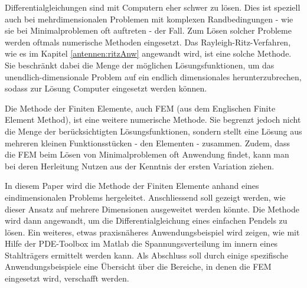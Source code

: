 %
%
%
%



Differentialgleichungen sind mit Computern eher schwer zu lösen. 
Dies ist speziell auch bei mehrdimensionalen Problemen mit komplexen Randbedingungen - wie sie bei Minimalproblemen oft auftreten - der Fall. 
Zum Lösen solcher Probleme werden oftmals numerische Methoden eingesetzt. 
Das Rayleigh-Ritz-Verfahren, wie es im Kapitel \ref{antennen:ritzAnw} angewandt wird, ist eine solche Methode.
Sie beschränkt dabei die Menge der möglichen Lösungsfunktionen, um das unendlich-dimensionale Problem auf ein endlich dimensionales herunterzubrechen, sodass zur Lösung Computer eingesetzt werden können. 

Die Methode der Finiten Elemente, auch FEM (aus dem Englischen Finite Element Method), ist eine weitere numerische Methode.
Sie begrenzt jedoch nicht die Menge der berücksichtigten Lösungsfunktionen, sondern stellt eine Lösung aus mehreren kleinen Funktionsstücken - den Elementen - zusammen.
Zudem, dass die FEM beim Lösen von Minimalproblemen oft Anwendung findet, kann man bei deren Herleitung Nutzen aus der Kenntnis der ersten Variation ziehen. 

In diesem Paper wird die Methode der Finiten Elemente anhand eines eindimensionalen Problems hergeleitet. 
Anschliessend soll gezeigt werden, wie dieser Ansatz auf mehrere Dimensionen ausgeweitet werden könnte. 
Die Methode wird dann angewandt, um die Differentialgleichung eines einfachen Pendels zu lösen. 
Ein weiteres, etwas praxisnäheres Anwendungsbeispiel wird zeigen, wie mit Hilfe der PDE-Toolbox im Matlab die Spannungsverteilung im innern eines Stahlträgers ermittelt werden kann. %
Als Abschluss soll durch einige spezifische Anwendungsbeispiele eine Übersicht über die Bereiche, in denen die FEM eingesetzt wird, verschafft werden.
